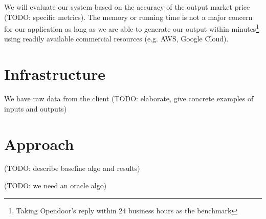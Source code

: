 \documentclass[12pt]{article}
\begin{document}
We will evaluate our system based on the accuracy of the output market price (TODO: specific metrics). The memory or running time is not a major concern for our application as long as we are able to generate our output within minutes\footnote{Taking Opendoor's reply within 24 business hours as the benchmark} using readily available commercial resources (e.g. AWS, Google Cloud).

\section*{Infrastructure}

We have raw data from the client (TODO: elaborate, give concrete examples of inputs and outputs)

\section*{Approach}

(TODO: describe baseline algo and results)

(TODO: we need an oracle algo)
\end{document}

